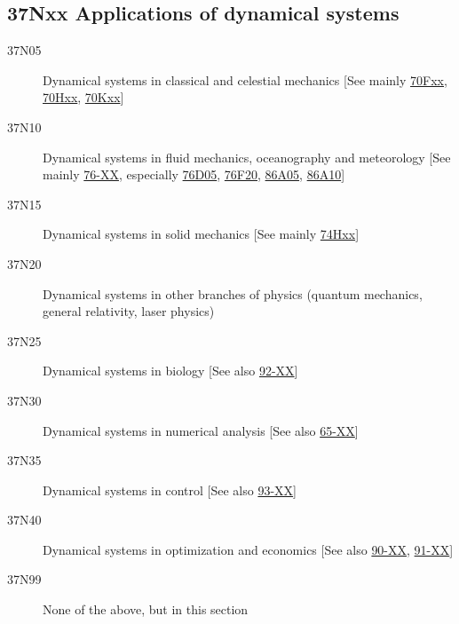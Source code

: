 \documentclass[letterpaper]{article}
\begin{document}
\subsection*{37Nxx  Applications of dynamical systems }\label{37Nxx}
\begin{description}  
\item [37N05]\label{37N05} Dynamical systems in classical and celestial mechanics [See mainly \hyperref[70Fxx]{70Fxx}, \hyperref[70Hxx]{70Hxx}, \hyperref[70Kxx]{70Kxx}]
\item [37N10]\label{37N10} Dynamical systems in fluid mechanics, oceanography and meteorology [See mainly \hyperref[76-XX]{76-XX}, especially  \hyperref[76D05]{76D05}, \hyperref[76F20]{76F20}, \hyperref[86A05]{86A05}, \hyperref[86A10]{86A10}]
\item [37N15]\label{37N15} Dynamical systems in solid mechanics [See mainly \hyperref[74Hxx]{74Hxx}]
\item [37N20]\label{37N20} Dynamical systems in other branches of physics (quantum mechanics, general relativity, laser physics)
\item [37N25]\label{37N25} Dynamical systems in biology [See also \hyperref[92-XX]{92-XX}]
\item [37N30]\label{37N30} Dynamical systems in numerical analysis [See also \hyperref[65-XX]{65-XX}]
\item [37N35]\label{37N35} Dynamical systems in control [See also \hyperref[93-XX]{93-XX}]
\item [37N40]\label{37N40} Dynamical systems in optimization and economics [See also \hyperref[90-XX]{90-XX}, \hyperref[91-XX]{91-XX}]
\item [37N99]\label{37N99} None of the above, but in this section
\end{description}
\end{document}
